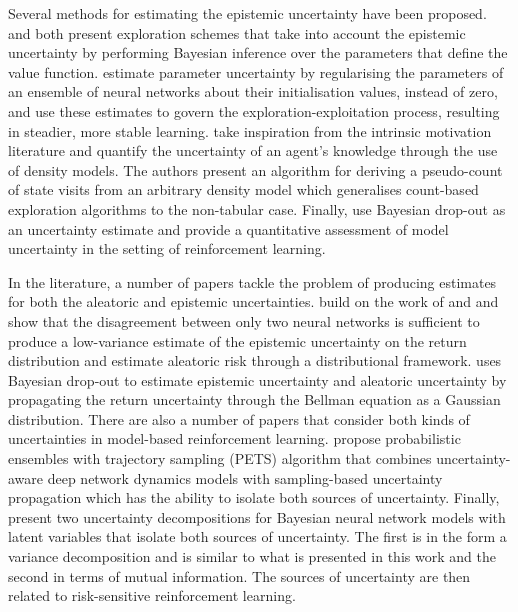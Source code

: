 Several methods for estimating the epistemic uncertainty have been proposed. \citet{azizzadenesheli2018efficient} and \citet{lipton2018bbq} both present exploration schemes that take into account the epistemic uncertainty by performing Bayesian inference over the parameters that define the value function. \citet{pearce2018bayesian}   estimate parameter uncertainty by regularising the parameters of an ensemble of neural networks about their initialisation values, instead of zero,  and use these estimates to govern the exploration-exploitation process, resulting in steadier, more stable learning. \citet{bellemare2016unifying} take inspiration from the intrinsic motivation literature and quantify the uncertainty of an agent's knowledge through the use of density models. The authors present an algorithm for deriving a pseudo-count of state visits from an arbitrary density model which generalises count-based exploration algorithms to the non-tabular case. Finally, \citet{gal2016dropout} use Bayesian drop-out as an uncertainty estimate and provide a quantitative assessment of model uncertainty in the setting of reinforcement learning.

In the literature, a number of papers tackle the problem of producing estimates for both the aleatoric and epistemic uncertainties. \citet{clements2019estimating} build on the work of \cite{gal2016dropout} and \citet{pearce2018bayesian} and show that the disagreement between only two neural networks is sufficient to produce a low-variance estimate of the epistemic uncertainty on the return distribution and estimate aleatoric risk through a distributional framework. \citet{moerland2017efficient} uses Bayesian drop-out to estimate epistemic uncertainty and aleatoric uncertainty by propagating the return uncertainty through the Bellman equation as a Gaussian distribution. There are also a number of papers that consider both kinds of uncertainties in model-based reinforcement learning. \citet{chua2018deep} propose probabilistic ensembles with trajectory sampling (PETS) algorithm that combines uncertainty-aware deep network dynamics models with sampling-based uncertainty propagation which has the ability to isolate both sources of uncertainty. Finally, \cite{depeweg2017decomposition} present two uncertainty decompositions for Bayesian neural network models with latent variables that isolate both sources of uncertainty. The first is in the form a variance decomposition and is similar to what is presented in this work and the second in terms of mutual information. The sources of uncertainty are then related to risk-sensitive reinforcement learning.